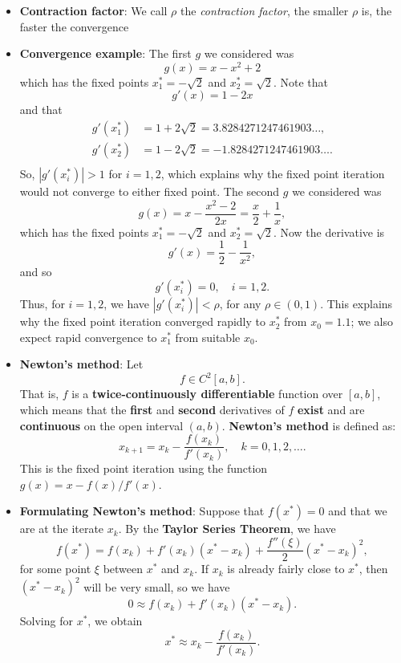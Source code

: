 \documentclass{report}
\begin{document}
\begin{itemize}
\item \textbf{Contraction factor}: We call $\rho$ the \textit{contraction factor}, the smaller $\rho$ is, the faster the convergence
\item \textbf{Convergence example}:
    The first $g$ we considered was
    $$g(x) = x - x^2 + 2$$
    which has the fixed points $x_1^* = -\sqrt{2}$ and $x_2^* = \sqrt{2}$. Note that
    $$g'(x) = 1 - 2x$$
    and that 
    $$\begin{align}
        g'(x_1^*) & = 1 + 2\sqrt{2} = 3.8284271247461903\ldots, \\
        g'(x_2^*) & = 1 - 2\sqrt{2} = -1.8284271247461903\ldots. \\
    \end{align}
    $$
    So, $\left|g'(x_i^*)\right| > 1$ for $i=1,2$, which explains why the fixed point iteration would not converge to either fixed point.
    \bigbreak \noindent 
    The second $g$ we considered was
    $$g(x) = x - \frac{x^2 - 2}{2x} = \frac{x}{2} + \frac{1}{x},$$
    which has the fixed points $x_1^* = -\sqrt{2}$ and $x_2^* = \sqrt{2}$. Now the derivative is
    $$g'(x) = \frac{1}{2} - \frac{1}{x^2},$$
    and so
    $$g'(x_i^*) = 0, \quad i=1,2.$$
    Thus, for $i=1,2$, we have $\left|g'(x_i^*)\right| < \rho$, for any $\rho \in (0,1)$. This explains why the fixed point iteration converged rapidly to $x_2^*$ from $x_0 = 1.1$; we also expect rapid convergence to $x_1^*$ from suitable $x_0$.
\item \textbf{Newton's method}:
    Let 
    \[
        f \in C^2[a,b].
    \]
    That is, \( f \) is a \textbf{twice-continuously differentiable} function over \([a,b]\), which means that the \textbf{first} and \textbf{second} derivatives of \( f \) \textbf{exist} and are \textbf{continuous} on the open interval \( (a,b) \). \textbf{Newton's method} is defined as:
    \[
        x_{k+1} = x_k - \frac{f(x_k)}{f'(x_k)}, \quad k = 0, 1, 2, \ldots.
    \]
    This is the fixed point iteration using the function \( g(x) = x - f(x)\big/ f'(x) \).
\item \textbf{Formulating Newton's method}:
    Suppose that $f(x^*) = 0$ and that we are at the iterate $x_k$. By the \textbf{Taylor Series Theorem}, we have
    $$
    f(x^*) = f(x_k) + f'(x_k)(x^* - x_k) + \frac{f''(\xi)}{2}(x^* - x_k)^2,
    $$
    for some point $\xi$ between $x^*$ and $x_k$. If $x_k$ is already fairly close to $x^*$, then $(x^* - x_k)^2$ will be very small, so we have
    $$0 \approx f(x_k) + f'(x_k)(x^* - x_k).$$
    Solving for $x^*$, we obtain
    $$x^* \approx x_k - \frac{f(x_k)}{f'(x_k)}.$$

\end{itemize}
\end{document}
